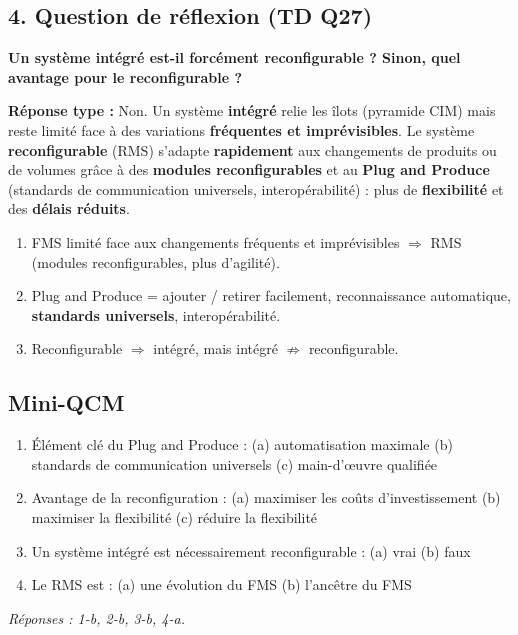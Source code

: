 \documentclass[11pt,a4paper]{article}
\begin{document}
\subsection*{4. Question de réflexion (TD Q27)}
\textbf{Un système intégré est-il forcément reconfigurable ? Sinon, quel avantage pour le reconfigurable ?}
\begin{note}
\textbf{Réponse type :} Non. Un système \textbf{intégré} relie les îlots (pyramide CIM) mais reste limité face à des variations \textbf{fréquentes et imprévisibles}. Le système \textbf{reconfigurable} (RMS) s'adapte \textbf{rapidement} aux changements de produits ou de volumes grâce à des \textbf{modules reconfigurables} et au \textbf{Plug and Produce} (standards de communication universels, interopérabilité) : plus de \textbf{flexibilité} et des \textbf{délais réduits}.
\end{note}

\begin{resume}
\begin{enumerate}
\item FMS limité face aux changements fréquents et imprévisibles $\Rightarrow$ RMS (modules reconfigurables, plus d'agilité).
\item Plug and Produce = ajouter / retirer facilement, reconnaissance automatique, \textbf{standards universels}, interopérabilité.
\item Reconfigurable $\Rightarrow$ intégré, mais intégré $\not\Rightarrow$ reconfigurable.
\end{enumerate}
\end{resume}

\subsection*{Mini-QCM}
\begin{enumerate}
\item Élément clé du Plug and Produce : (a) automatisation maximale (b) standards de communication universels (c) main-d'œuvre qualifiée
\item Avantage de la reconfiguration : (a) maximiser les coûts d'investissement (b) maximiser la flexibilité (c) réduire la flexibilité
\item Un système intégré est nécessairement reconfigurable : (a) vrai (b) faux
\item Le RMS est : (a) une évolution du FMS (b) l'ancêtre du FMS
\end{enumerate}
{\small\textit{Réponses : 1-b, 2-b, 3-b, 4-a.}}
\end{document}
